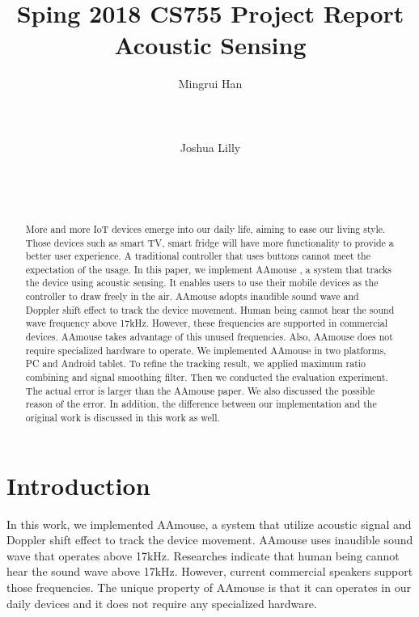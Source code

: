 \documentclass{acm_proc_article-sp}
\begin{document}
\title{Sping 2018 CS755 Project Report Acoustic Sensing}

\author{
\alignauthor
Mingrui Han\\
       \\
       \\
       \\
\alignauthor
Joshua Lilly\\
       \\
       \\
       \\
}

\maketitle
\begin{abstract}
More and more IoT devices emerge into our daily life, aiming to ease
our living style. Those devices such as smart TV, smart fridge
will have more functionality to provide a better user experience.
A traditional controller that uses buttons cannot meet the expectation
of the usage. In this paper, we implement AAmouse \cite{yun:turning}, a system that tracks the device using acoustic sensing. It enables
users to use their mobile devices as the controller to
draw freely in the air. AAmouse adopts inaudible sound wave and Doppler shift effect to track the device movement. Human being cannot
hear the sound wave frequency above 17kHz. However, these frequencies 
are supported in commercial devices. AAmouse takes advantage of this
unused frequencies. Also, AAmouse does not require specialized 
hardware to operate. We implemented AAmouse in two platforms, PC and Android tablet. To refine the tracking result, we applied maximum
ratio combining and signal smoothing filter. Then we conducted the 
evaluation experiment. The actual error is larger than the AAmouse
paper. We also discussed the possible reason of the error. In 
addition, the difference between our implementation and the 
original work is discussed in this work as well.
\end{abstract}


\section{Introduction}
In this work, we implemented AAmouse, a system that utilize 
acoustic signal and Doppler shift effect to track the device movement.
AAmouse uses inaudible sound wave that operates above 17kHz.
Researches indicate that human being cannot hear the sound wave above
17kHz. However, current commercial speakers support those frequencies.
The unique property of AAmouse is that it can operates in our daily 
devices and it does not require any specialized hardware.
\end{document}
